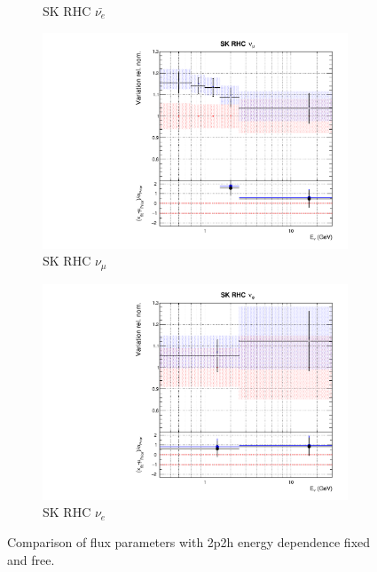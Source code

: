 \begin{figure}
\begin{subfigure}{0.24\textwidth}
  \caption{SK RHC $\bar{\nu_e}$}
\end{subfigure}
\begin{subfigure}{0.24\textwidth}
  \centering
  \includegraphics[width=0.95\linewidth]{figs/fixed2p2hflux14}
  \caption{SK RHC $\nu_{\mu}$}
\end{subfigure}
\begin{subfigure}{0.24\textwidth}
  \centering
  \includegraphics[width=0.95\linewidth]{figs/fixed2p2hflux15}
  \caption{SK RHC $\nu_e$}
\end{subfigure}
\caption{Comparison of flux parameters with 2p2h energy dependence fixed and free.}
\label{fig:fixed2p2hflux}
\end{figure}

